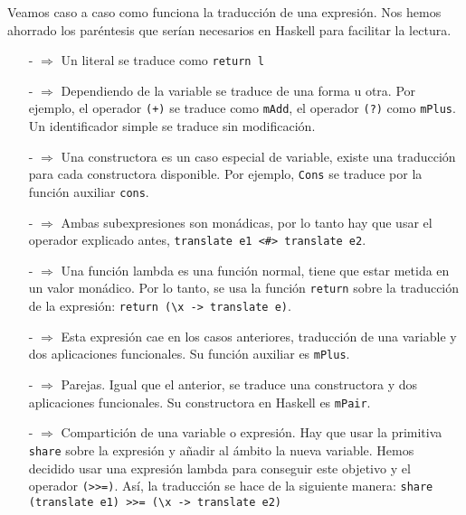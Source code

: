 \documentclass[class=article, crop=false]{standalone}
\begin{document}
Veamos caso a caso como funciona la traducción de una expresión. Nos hemos ahorrado los
paréntesis que serían necesarios en Haskell para facilitar la lectura.

\begin{itemize}
  \item[-]{} $\Rightarrow$ Un literal se traduce como
  \verb`return l`
  
  \item[-]{} $\Rightarrow$ Dependiendo de la variable se traduce de
  una forma u otra. Por ejemplo, el operador \verb`(+)` se traduce como \verb`mAdd`, el
  operador \verb`(?)` como \verb`mPlus`. Un identificador simple se traduce sin modificación.
  
  \item[-]{} $\Rightarrow$ Una constructora es un caso especial de
  variable, existe una traducción para cada constructora disponible. Por ejemplo, \verb`Cons`
  se traduce por la función auxiliar \verb`cons`.

  \item[-]{} $\Rightarrow$ Ambas subexpresiones son
  monádicas, por lo tanto hay que usar el operador explicado antes,
  \verb`translate e1 <#> translate e2`.

  \item[-]{} $\Rightarrow$ Una función
  lambda es una función normal, tiene que estar metida en un valor monádico. Por lo tanto, se
  usa la función \verb`return` sobre la traducción de la expresión:
  \verb`return (\x -> translate e)`.

  \item[-]{}  $\Rightarrow$ Esta expresión cae en los
  casos anteriores, traducción de una variable y dos aplicaciones funcionales. Su función
  auxiliar es \verb`mPlus`.

  \item[-]{} $\Rightarrow$ Parejas. Igual que el
  anterior, se traduce una constructora y dos aplicaciones funcionales. Su constructora en
  Haskell es \verb`mPair`.

  \item[-]{} $\Rightarrow$ Compartición
  de una variable o expresión. Hay que usar la primitiva \verb`share` sobre la expresión y
  añadir al ámbito la nueva variable. Hemos decidido usar una expresión lambda para conseguir
  este objetivo y el operador \verb`(>>=)`. Así, la traducción se hace de la siguiente
  manera: \verb`share (translate e1) >>= (\x -> translate e2)`


\end{itemize}
\end{document}

